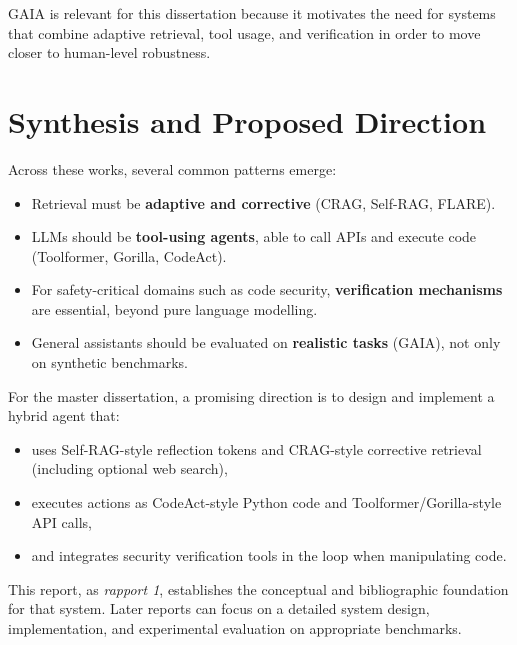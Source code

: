\documentclass[11pt,a4paper]{article}
\begin{document}
GAIA is relevant for this dissertation because it motivates the need for systems that combine adaptive retrieval, tool usage, and verification in order to move closer to human-level robustness.

\section{Synthesis and Proposed Direction}

Across these works, several common patterns emerge:
\begin{itemize}[leftmargin=1.2cm]
  \item Retrieval must be \textbf{adaptive and corrective} (CRAG, Self-RAG, FLARE).
  \item LLMs should be \textbf{tool-using agents}, able to call APIs and execute code (Toolformer, Gorilla, CodeAct).
  \item For safety-critical domains such as code security, \textbf{verification mechanisms} are essential, beyond pure language modelling.
  \item General assistants should be evaluated on \textbf{realistic tasks} (GAIA), not only on synthetic benchmarks.
\end{itemize}

For the master dissertation, a promising direction is to design and implement a hybrid agent that:
\begin{itemize}[leftmargin=1.2cm]
  \item uses Self-RAG-style reflection tokens and CRAG-style corrective retrieval (including optional web search),
  \item executes actions as CodeAct-style Python code and Toolformer/Gorilla-style API calls,
  \item and integrates security verification tools in the loop when manipulating code.
\end{itemize}

This report, as \emph{rapport 1}, establishes the conceptual and bibliographic foundation for that system. Later reports can focus on a detailed system design, implementation, and experimental evaluation on appropriate benchmarks.
\end{document}
